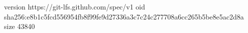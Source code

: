 version https://git-lfs.github.com/spec/v1
oid sha256:e8b1c5fcd556954fb8f99fe9d27336a3c7c24c277708a6cc265b5be8e5ac2d8a
size 43840
